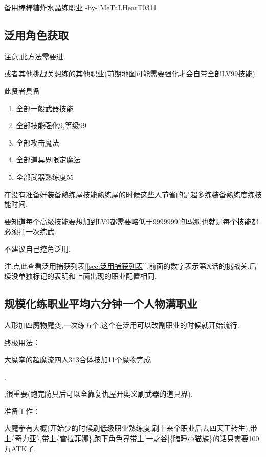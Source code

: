 	备用\href{http://tieba.baidu.com/p/3717431968}{棒棒糖炸水晶练职业 -by- MeTaLHearT0311}

		\subsection{泛用角色获取}

		注意,此方法需要进{\color{red}{修罗以后}}.

		{\color{red}{去兔兔魔界挑战关,抓捕贤者}}或者其他挑战关想练的其他职业(前期地图可能需要强化才会自带全部LV99技能).

		此贤者具备
		\begin{enumerate}
			\item 全部一般武器技能
			\item 全部技能强化9,等级99
			\item 全部攻击魔法
			\item 全部道具界限定魔法
			\item 全部武器熟练度55
		\end{enumerate}
		
		在没有准备好装备熟练屋技能熟练屋的时候这些人节省的是超多练装备熟练度练技能时间.

		要知道每个高级技能要想加到LV9都需要略低于9999999的玛娜,也就是每个技能都必须打一次练武.

		不建议自己挖角泛用.

		注:点此查看泛用捕获列表[\ref{sec:泛用捕获列表}],前面的数字表示第X话的挑战关.后续没单独标记的表明和上面出现的职业配置相同.

	\newpage

		\subsection{规模化练职业平均六分钟一个人物满职业}

		人形加四魔物魔变,一次练五个.这个在泛用可以改副职业的时候就开始流行.

		终极用法：

		大魔拳的超魔流四人3*3合体技加11个魔物完成

		{\color{red}{修罗巴尔必备杰洛肯,有男主最好,需要大量千万级能力角色,所以这步可视为修罗巴尔攻略的必经之路}}.

		{\color{red}{记得练上魔女和兔兔莉亚,同步探索魔界收集41武器}},很重要(跑完防具后可以全靠复仇屋开奥义刷武器的道具界).

		准备工作：

		大魔拳有大概{\color{red}{200万能力}}(开始少的时候刷低级职业熟练度,刷十来个职业后去四天王转生),带上{\color{red}{[可靠的伙伴]}}\{奇力亚\},带上{\color{red}{生杀予夺}}\{雪拉菲娜\},跑下角色界带上[一之谷]\{瞌睡小猫族\}的话只需要100万ATK了.

